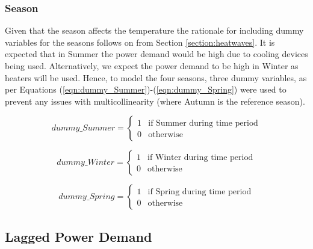 \documentclass[11pt]{article}
\begin{document}
\subsubsection{Season}
\label{section:season}
Given that the season affects the temperature the rationale for including dummy variables for the seasons follows on from Section \ref{section:heatwaves}. It is expected that in Summer the power demand would be high due to cooling devices being used. Alternatively, we expect the power demand to be high in Winter as heaters will be used. Hence, to model the four seasons, three dummy variables, as per Equations (\ref{eqn:dummy_Summer})-(\ref{eqn:dummy_Spring}) were used to prevent any issues with multicollinearity (where Autumn is the reference season). 

\begin{equation}
\label{eqn:dummy_Summer}
dummy\_Summer = 
  \begin{cases}
	1 & \text{if Summer during time period} \\
    0 & \text{otherwise}
  \end{cases}
\end{equation}

\begin{equation}
\label{eqn:dummy_Winter}
dummy\_Winter = 
  \begin{cases}
	1 & \text{if Winter during time period} \\
    0 & \text{otherwise}
  \end{cases}
\end{equation}

\begin{equation}
\label{eqn:dummy_Spring}
dummy\_Spring = 
  \begin{cases}
	1 & \text{if Spring during time period} \\
    0 & \text{otherwise}
  \end{cases}
\end{equation}

\subsection{Lagged Power Demand}

\end{document}
